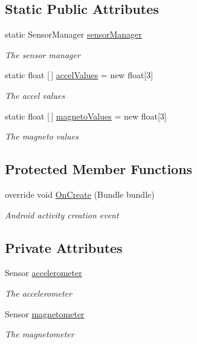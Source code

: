 \subsection*{Static Public Attributes}
\begin{DoxyCompactItemize}
\item 
static Sensor\+Manager \hyperlink{classXaria_1_1Activity1_a24e5f33379e7c617726f819305e211a1}{sensor\+Manager}
\begin{DoxyCompactList}\small\item\em The sensor manager \end{DoxyCompactList}\item 
static float \mbox{[}$\,$\mbox{]} \hyperlink{classXaria_1_1Activity1_a27724ecd7f40103c5f2e1175d4138283}{accel\+Values} = new float\mbox{[}3\mbox{]}
\begin{DoxyCompactList}\small\item\em The accel values \end{DoxyCompactList}\item 
static float \mbox{[}$\,$\mbox{]} \hyperlink{classXaria_1_1Activity1_a258919f676bc970cf2b0742591932ba9}{magneto\+Values} = new float\mbox{[}3\mbox{]}
\begin{DoxyCompactList}\small\item\em The magneto values \end{DoxyCompactList}\end{DoxyCompactItemize}
\subsection*{Protected Member Functions}
\begin{DoxyCompactItemize}
\item 
override void \hyperlink{classXaria_1_1Activity1_a1b2c637e080b9032389a43705d193581}{On\+Create} (Bundle bundle)
\begin{DoxyCompactList}\small\item\em Android activity creation event \end{DoxyCompactList}\end{DoxyCompactItemize}
\subsection*{Private Attributes}
\begin{DoxyCompactItemize}
\item 
Sensor \hyperlink{classXaria_1_1Activity1_a60c77f521c1a61fe00fad362d9cae9ea}{accelerometer}
\begin{DoxyCompactList}\small\item\em The accelerometer \end{DoxyCompactList}\item 
Sensor \hyperlink{classXaria_1_1Activity1_a7fd08945593fa05793e41e4e52818636}{magnetometer}
\begin{DoxyCompactList}\small\item\em The magnetometer \end{DoxyCompactList}\end{DoxyCompactItemize}


